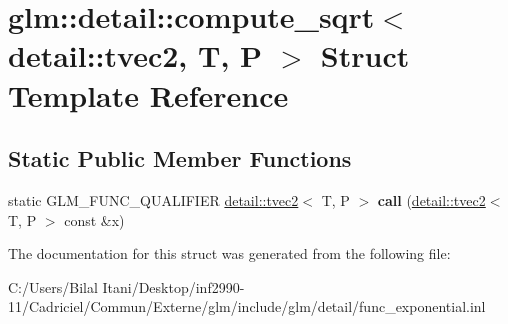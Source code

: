 \hypertarget{structglm_1_1detail_1_1compute__sqrt_3_01detail_1_1tvec2_00_01_t_00_01_p_01_4}{}\section{glm\+:\+:detail\+:\+:compute\+\_\+sqrt$<$ detail\+:\+:tvec2, T, P $>$ Struct Template Reference}
\label{structglm_1_1detail_1_1compute__sqrt_3_01detail_1_1tvec2_00_01_t_00_01_p_01_4}
\subsection*{Static Public Member Functions}
\begin{DoxyCompactItemize}
\item 
static G\+L\+M\+\_\+\+F\+U\+N\+C\+\_\+\+Q\+U\+A\+L\+I\+F\+I\+ER \hyperlink{structglm_1_1detail_1_1tvec2}{detail\+::tvec2}$<$ T, P $>$ {\bfseries call} (\hyperlink{structglm_1_1detail_1_1tvec2}{detail\+::tvec2}$<$ T, P $>$ const \&x)\hypertarget{structglm_1_1detail_1_1compute__sqrt_3_01detail_1_1tvec2_00_01_t_00_01_p_01_4_aa1063e71bb3144910901a224d41d88f7}{}\label{structglm_1_1detail_1_1compute__sqrt_3_01detail_1_1tvec2_00_01_t_00_01_p_01_4_aa1063e71bb3144910901a224d41d88f7}

\end{DoxyCompactItemize}


The documentation for this struct was generated from the following file\+:\begin{DoxyCompactItemize}
\item 
C\+:/\+Users/\+Bilal Itani/\+Desktop/inf2990-\/11/\+Cadriciel/\+Commun/\+Externe/glm/include/glm/detail/func\+\_\+exponential.\+inl\end{DoxyCompactItemize}
